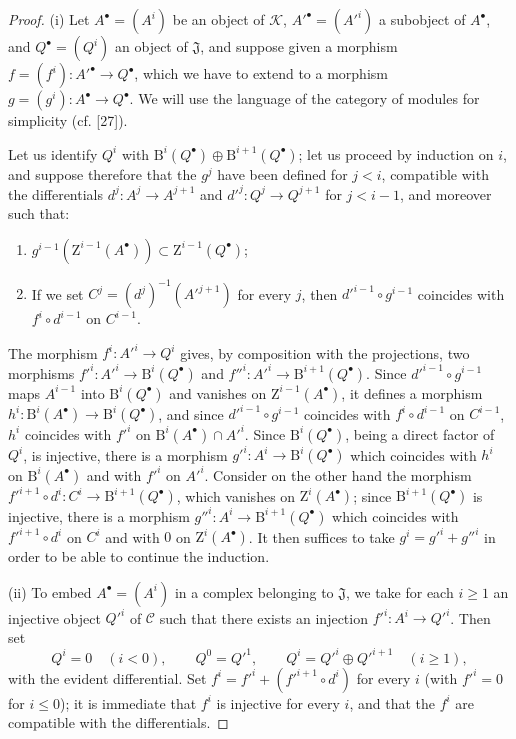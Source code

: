 \begin{proof}
\textup{(i)} Let $A^\bullet=(A^i)$ be an object of $\mathcal K$,
$A'^\bullet=(A'^i)$ a subobject of $A^\bullet$, and
$Q^\bullet=(Q^i)$ an object of $\mathfrak J$, and suppose given a morphism
$f=(f^i):A'^\bullet\to Q^\bullet$, which we have to extend to a morphism
$g=(g^i):A^\bullet\to Q^\bullet$. We will use the language of the category
of modules for simplicity (cf. [27]).

Let us identify $Q^i$ with
$\mathrm B^i(Q^\bullet)\oplus\mathrm B^{i+1}(Q^\bullet)$; let us proceed by
induction on $i$, and suppose therefore that the $g^j$ have been defined for $j<i$,
compatible with the differentials $d^j:A^j\to A^{j+1}$ and
$d'^j:Q^j\to Q^{j+1}$ for $j<i-1$, and moreover such that:
\begin{enumerate}
  \item[$1^\circ$] $g^{i-1}(\mathrm Z^{i-1}(A^\bullet))\subset
    \mathrm Z^{i-1}(Q^\bullet)$;
  \item[$2^\circ$] If we set $C^j=(d^j)^{-1}(A'^{j+1})$ for every $j$, then
    $d'^{i-1}\circ g^{i-1}$ coincides with $f^i\circ d^{i-1}$ on $C^{i-1}$.
\end{enumerate}
The morphism $f^i:A'^i\to Q^i$ gives, by composition with the projections,
two morphisms
$f'^i:A'^i\to\mathrm B^i(Q^\bullet)$ and
$f''^i:A'^i\to\mathrm B^{i+1}(Q^\bullet)$. Since
$d'^{i-1}\circ g^{i-1}$ maps $A^{i-1}$ into
$\mathrm B^i(Q^\bullet)$ and vanishes on $\mathrm Z^{i-1}(A^\bullet)$, it
defines a morphism
$h^i:\mathrm B^i(A^\bullet)\to\mathrm B^i(Q^\bullet)$, and since
$d'^{i-1}\circ g^{i-1}$ coincides with $f^i\circ d^{i-1}$ on $C^{i-1}$,
$h^i$ coincides with $f'^i$ on
$\mathrm B^i(A^\bullet)\cap A'^i$. Since $\mathrm B^i(Q^\bullet)$, being a direct
factor of $Q^i$, is injective, there is a morphism
$g'^i:A^i\to\mathrm B^i(Q^\bullet)$ which coincides with $h^i$ on
$\mathrm B^i(A^\bullet)$ and with $f'^i$ on $A'^i$. Consider on the other hand
the morphism
$f'^{i+1}\circ d^i:C^i\to\mathrm B^{i+1}(Q^\bullet)$, which vanishes on
$\mathrm Z^i(A^\bullet)$; since $\mathrm B^{i+1}(Q^\bullet)$ is injective,
there is a morphism $g''^i:A^i\to\mathrm B^{i+1}(Q^\bullet)$ which coincides
with $f'^{i+1}\circ d^i$ on $C^i$ and with $0$ on
$\mathrm Z^i(A^\bullet)$. It then suffices to take $g^i=g'^i+g''^i$ in order
to be able to continue the induction.

\textup{(ii)} To embed $A^\bullet=(A^i)$ in a complex belonging to
$\mathfrak J$, we take for each $i\geq1$ an injective object $Q'^i$ of
$\mathcal C$ such that there exists an injection $f'^i:A^i\to Q'^i$. Then
set
\[
  Q^i=0\quad(i<0),\qquad Q^0=Q'^1,\qquad
  Q^i=Q'^i\oplus Q'^{i+1}\quad(i\geq1),
\]
with the evident differential. Set
$f^i=f'^i+(f'^{i+1}\circ d^i)$ for every $i$ (with $f'^i=0$ for $i\leq0$);
it is immediate that $f^i$ is injective for every $i$, and that the $f^i$ are
compatible with the differentials.
\end{proof}

